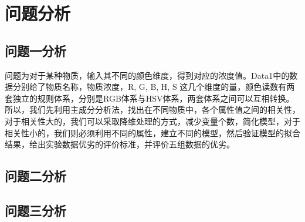 \section{问题分析}
\subsection{问题一分析}
问题为对于某种物质，输入其不同的颜色维度，得到对应的浓度值。Data1中的数据分别给了物质名称，物质浓度，R, G, B, H, S 这几个维度的量，颜色读数有两套独立的规则体系，分别是RGB体系与HSV体系，两套体系之间可以互相转换。所以，我们先利用主成分分析法，找出在不同物质中，各个属性值之间的相关性，对于相关性大的，我们可以采取降维处理的方式，减少变量个数，简化模型，对于相关性小的，我们则必须利用不同的属性，建立不同的模型，然后验证模型的拟合结果，给出实验数据优劣的评价标准，并评价五组数据的优劣。

\subsection{问题二分析}

\subsection{问题三分析}
